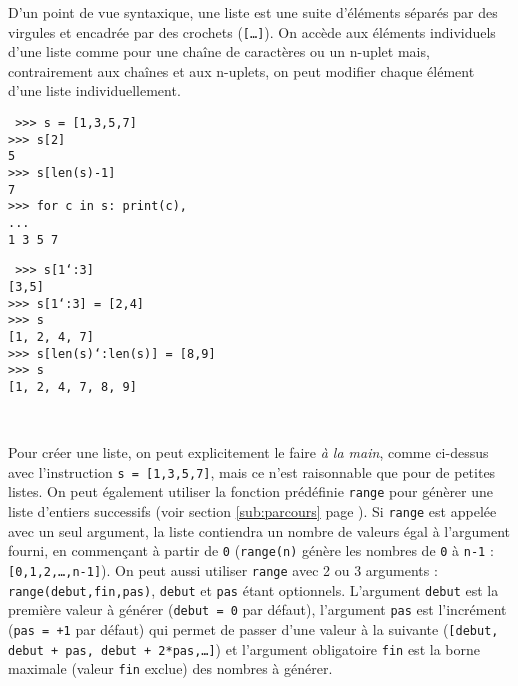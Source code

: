 D'un point de vue syntaxique, une liste est une suite d'éléments
séparés par des virgules et encadrée par des crochets ({\tt [\ldots]}).
On accède aux éléments individuels d'une liste comme pour une chaîne de caractères
ou un n-uplet mais, contrairement aux chaînes et aux n-uplets, on peut modifier
chaque élément d'une liste individuellement.

\noindent\mbox{}\hspace*{1cm}\begin{py}{6.5cm}\tt
>>> s = [1,3,5,7]\\
>>> s[2]\\
5\\
>>> s[len(s)-1]\\
7\\
>>> for c in s: print(c),\\
... \\
1 3 5 7
\end{py}
\hfill
\begin{py}{6.5cm}\tt
>>> s[1\char`:3]\\
\mbox{}[3,5]\\
>>> s[1\char`:3] = [2,4]\\
>>> s\\
\mbox{}[1, 2, 4, 7]\\
>>> s[len(s)\char`:len(s)] = [8,9]\\
>>> s\\
\mbox{}[1, 2, 4, 7, 8, 9]
\end{py}\\

\vspace*{2mm}

Pour créer une liste, on peut explicitement le faire {\em à la main}, comme ci-dessus
avec l'instruction {\tt s = [1,3,5,7]}, mais ce n'est raisonnable que pour de 
petites listes. On peut également utiliser la fonction prédéfinie {\tt range}
pour génèrer une liste d'entiers successifs 
(voir section \ref{sub:parcours} page \pageref{sub:parcours}). 
Si {\tt range} est appelée avec un seul argument, la liste contiendra un nombre de 
valeurs égal à l'argument fourni, en commençant à partir de {\tt 0} 
({\tt range(n)} génère les nombres de {\tt 0} à {\tt n-1} : {\tt [0,1,2,\ldots,n-1]}).
On peut aussi utiliser {\tt range} avec 2 ou 3 arguments : {\tt range(debut,fin,pas)},
{\tt debut} et {\tt pas} étant optionnels.
L'argument {\tt debut} est la première valeur à générer ({\tt debut = 0} par défaut), 
l'argument {\tt pas} est l'incrément ({\tt pas = +1} par défaut) qui permet
de passer d'une valeur à la suivante ({\tt [debut, debut + pas, debut + 2*pas,\ldots]})
et l'argument obligatoire {\tt fin} est la borne maximale (valeur {\tt fin} exclue) des nombres à générer.

